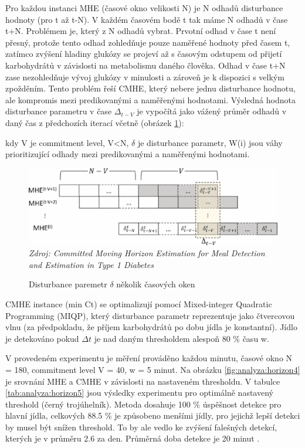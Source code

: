 Pro každou instanci MHE (časové okno velikosti N) je N odhadů disturbance hodnoty (pro t až t-N). V každém časovém bodě t tak máme N odhadů v čase t+N. Problémem je, který z N odhadů vybrat. Prvotní odhad v čase t není přesný, protože tento odhad zohledňuje pouze naměřené hodnoty před časem t, zatímco zvýšení hladiny glukózy se projeví až s časovým odstupem od přijetí karbohydrátů v závislosti na metabolismu daného člověka. Odhad v čase t+N zase nezohledňuje vývoj glukózy v minulosti a zároveň je k dispozici s velkým zpožděním. Tento problém řeší CMHE, který nebere jednu disturbance hodnotu, ale kompromis mezi predikovanými a naměřenými hodnotami. Výsledná hodnota disturbance parametru v čase $\Delta_{t-V}$ je vypočítá jako vážený průměr odhadů v daný čas z předchozích iterací včetně (obrázek \ref{fig:analyza:horizon1}):


kdy V je commitment level, V<N, $\delta$ je disturbance parametr, W(i) jsou váhy prioritizující odhady mezi predikovanými a naměřenými hodnotami.

\begin{figure}[H]
\caption{Disturbance paremetr $\delta$ několik časových oken}
\label{fig:analyza:horizon1}
\centering
\includegraphics[width=1\textwidth]{img/analyzaCHO/horizon1.png}\\
\textit{Zdroj: Committed Moving Horizon Estimation for Meal Detection and Estimation in Type 1 Diabetes \citep{analyzaCHO.MovingHorizon}}
\end{figure}

CMHE instance (min Ct) se optimalizují pomocí Mixed-integer Quadratic Programming (MIQP), který disturbance parametr reprezentuje jako čtvercovou vlnu (za předpokladu, že příjem karbohydrátů po dobu jídla je konstantní). Jídlo je detekováno pokud $\Delta t$ je nad daným thresholdem alespoň 80 \% času w.

V provedeném experimentu je měření prováděno každou minutu, časové okno N = 180, commitment level V = 40, w = 5 minut. Na obrázku \ref{fig:analyza:horizon4} je srovnání MHE a CMHE v závislosti na nastaveném thresholdu.  V tabulce \ref{tab:analyza:horizon5} jsou výsledky experimentu pro optimálně nastavený threshold (černý trojúhelník). Metoda dosahuje 100 \% úspěšnost detekce pro hlavní jídla, celkových 88.5 \% je způsobeno menšími jídly, pro jejichž lepší detekci by musel být snížen threshold. To by ale vedlo ke zvýšení falešných detekcí, kterých je v průměru 2.6 za den. Průměrná doba detekce je 20 minut \citep{analyzaCHO.MovingHorizon}.

